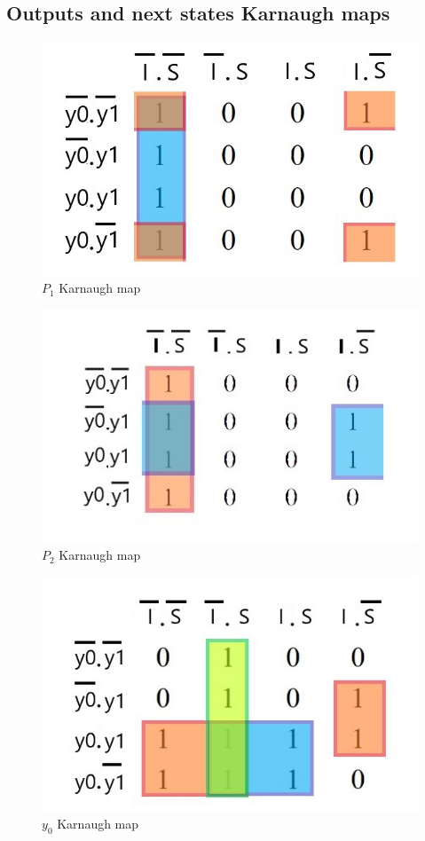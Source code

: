 \documentclass[../../e3_tp3_main.tex]{subfiles}
\begin{document}
\subsection{Outputs and next states Karnaugh maps}
\begin{figure}[H]
	\centering
	\includegraphics[scale=0.7]{figures/e3_tp3_ej1_mealy_b1_kmap.jpg}
	\caption{$P_1$ Karnaugh map}
\end{figure}
\begin{figure}[H]
	\centering
	\includegraphics[scale=1]{figures/e3_tp3_ej1_mealy_b2_kmap.jpg}
	\caption{$P_2$ Karnaugh map}
\end{figure}
\begin{figure}[H]
	\centering
	\includegraphics[scale=0.8]{figures/e3_tp3_ej1_mealy_y0_kmap.jpg}
	\caption{$y_0$ Karnaugh map}
\end{figure}
\end{document}
